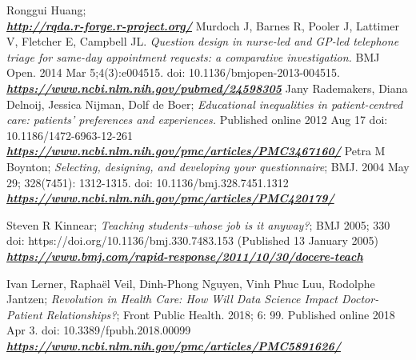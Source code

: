 \documentclass[12pt,a4paper,oneside]{article}
\begin{document}
\begin{thebibliography}{11}
Ronggui Huang; \\\textbf{\emph{\href{http://rqda.r-forge.r-project.org/}{\url{http://rqda.r-forge.r-project.org/}}}}
Murdoch J, Barnes R, Pooler J, Lattimer V, Fletcher E, Campbell JL. \emph{Question design in nurse-led and GP-led telephone triage for same-day appointment requests: a comparative investigation.} BMJ Open. 2014 Mar 5;4(3):e004515. doi: 10.1136/bmjopen-2013-004515.\\\textbf{\emph{\href{https://www.ncbi.nlm.nih.gov/pubmed/24598305}{\url{https://www.ncbi.nlm.nih.gov/pubmed/24598305}}}}
Jany Rademakers, Diana Delnoij, Jessica Nijman, Dolf de Boer; \emph{Educational inequalities in patient-centred care: patients' preferences and experiences.} Published online 2012 Aug 17 doi: 10.1186/1472-6963-12-261\\\textbf{\emph{\href{https://www.ncbi.nlm.nih.gov/pmc/articles/PMC3467160/}{\url{https://www.ncbi.nlm.nih.gov/pmc/articles/PMC3467160/}}}}
Petra M Boynton; \emph{Selecting, designing, and developing your questionnaire}; BMJ. 2004 May 29; 328(7451): 1312-1315. doi: 10.1136/bmj.328.7451.1312\\\textbf{\emph{\href{https://www.ncbi.nlm.nih.gov/pmc/articles/PMC420179/}{\url{https://www.ncbi.nlm.nih.gov/pmc/articles/PMC420179/}}}}


Steven R Kinnear; \emph{Teaching students--whose job is it anyway?}; BMJ 2005; 330 doi: https://doi.org/10.1136/bmj.330.7483.153 (Published 13 January 2005)\\\textbf{\emph{\href{https://www.bmj.com/rapid-response/2011/10/30/docere-teach}{\url{https://www.bmj.com/rapid-response/2011/10/30/docere-teach}}}}

Ivan Lerner, Raphaël Veil, Dinh-Phong Nguyen, Vinh Phuc Luu, Rodolphe Jantzen; \emph{Revolution in Health Care: How Will Data Science Impact Doctor-Patient Relationships?}; Front Public Health. 2018; 6: 99.
Published online 2018 Apr 3. doi:  10.3389/fpubh.2018.00099\\\textbf{\emph{\href{https://www.ncbi.nlm.nih.gov/pmc/articles/PMC5891626/
}{\url{https://www.ncbi.nlm.nih.gov/pmc/articles/PMC5891626/
}}}}


\end{thebibliography}
\end{document}
